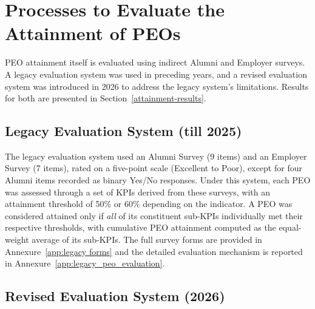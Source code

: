 
\hypertarget{attainment-of-peos}{%
\section{Processes to Evaluate the Attainment of PEOs}\label{attainment-of-peos}}
PEO attainment itself is evaluated using indirect Alumni and Employer surveys.  A legacy evaluation system was used in preceding years, and a revised evaluation system was introduced in 2026 to address the legacy system's limitations. Results for both are presented in Section~\ref{attainment-results}.

\subsection{Legacy Evaluation System (till 2025)}

The legacy evaluation system used an Alumni Survey (9 items) and an Employer Survey (7 items), rated on a five-point scale (Excellent to Poor), except for four Alumni items recorded as binary Yes/No responses. Under this system, each PEO was assessed through a set of KPIs derived from these surveys, with an attainment threshold of 50\% or 60\% depending on the indicator. A PEO was considered attained only if \emph{all} of its constituent sub-KPIs individually met their respective thresholds, with cumulative PEO attainment computed as the equal-weight average of its sub-KPIs. The full survey forms are provided in Annexure~\ref{app:legacy forms} and the detailed evaluation mechanism is reported in Annexure~\ref{app:legacy_peo_evaluation}.

\subsection{Revised Evaluation System (2026)}

